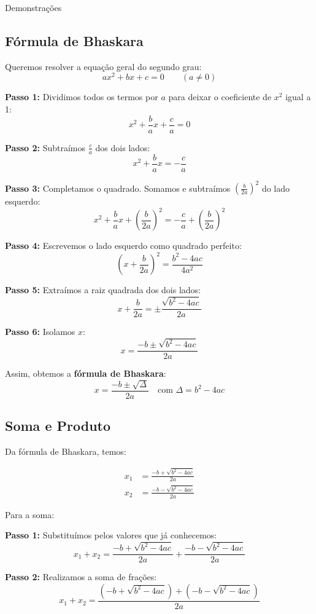 \documentclass[12pt]{report}
\newcommand{\1}{\faThermometerEmpty}
\newcommand{\2}{\faThermometerQuarter}
\newcommand{\3}{\faThermometerHalf}
\newcommand{\4}{\faThermometerThreeQuarters}
\newcommand{\5}{\faThermometerFull}
\begin{document}
\pagebreak

\begin{center}
{\Large Demonstrações}
\end{center}
\subsection*{Fórmula de Bhaskara}

Queremos resolver a equação geral do segundo grau:
\[
ax^2 + bx + c = 0 \qquad (a \neq 0)
\]

\textbf{Passo 1:} Dividimos todos os termos por $a$ para deixar o coeficiente de $x^2$ igual a 1:
\[
x^2 + \frac{b}{a}x + \frac{c}{a} = 0
\]

\textbf{Passo 2:} Subtraímos $\frac{c}{a}$ dos dois lados:
\[
x^2 + \frac{b}{a}x = -\frac{c}{a}
\]

\textbf{Passo 3:} Completamos o quadrado. Somamos e subtraímos $\left(\frac{b}{2a}\right)^2$ do lado esquerdo:
\[
x^2 + \frac{b}{a}x + \left( \frac{b}{2a} \right)^2 = -\frac{c}{a} + \left( \frac{b}{2a} \right)^2
\]

\textbf{Passo 4:} Escrevemos o lado esquerdo como quadrado perfeito:
\[
\left( x + \frac{b}{2a} \right)^2 = \frac{b^2 - 4ac}{4a^2}
\]

\textbf{Passo 5:} Extraímos a raiz quadrada dos dois lados:
\[
x + \frac{b}{2a} = \pm \frac{\sqrt{b^2 - 4ac}}{2a}
\]

\textbf{Passo 6:} Isolamos $x$:
\[
x = \frac{-b \pm \sqrt{b^2 - 4ac}}{2a}
\]

Assim, obtemos a \textbf{fórmula de Bhaskara}:
\[
x = \frac{-b \pm \sqrt{\Delta}}{2a} \quad \text{com } \Delta = b^2 - 4ac
\]

\pagebreak
\subsection*{Soma e Produto}
Da fórmula de Bhaskara, temos:

$$
\begin{aligned}
x_1 &= \frac{-b + \sqrt{b^2 - 4ac}}{2a} \\
x_2 &= \frac{-b - \sqrt{b^2 - 4ac}}{2a}
\end{aligned}
$$

Para a soma:

\textbf{Passo 1:} Substituímos pelos valores que já conhecemos:
$$x_1+x_2 = \frac{-b + \sqrt{b^2 - 4ac}}{2a} + \frac{-b - \sqrt{b^2 - 4ac}}{2a}$$

\textbf{Passo 2:} Realizamos a soma de frações:
$$x_1+x_2 = \frac{(-b + \sqrt{b^2 - 4ac})+(-b - \sqrt{b^2 - 4ac})}{2a}$$
\end{document}
